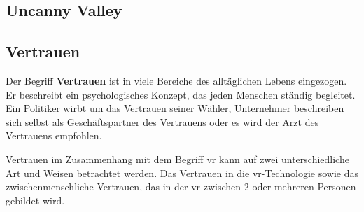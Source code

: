 \documentclass[a4paper,11pt]{article}%
\renewcommand{\\}{\vspace*{0.5\baselineskip} \newline}
\begin{document}
\subsection{Uncanny Valley}

%




	





\newpage

	\subsection{Vertrauen}
	\label{Vertrauen}
Der Begriff \textbf{Vertrauen} ist in viele Bereiche des alltäglichen Lebens eingezogen. Er beschreibt ein psychologisches Konzept, das jeden Menschen ständig begleitet.
Ein Politiker wirbt um das Vertrauen seiner Wähler, Unternehmer beschreiben sich selbst als Geschäftspartner des Vertrauens oder es wird der \dq{}Arzt des Vertrauens\dq{} empfohlen.

Vertrauen im Zusammenhang mit dem Begriff \dq{}\ac{vr}\dq{} kann auf zwei unterschiedliche Art und Weisen betrachtet werden. Das Vertrauen in die \ac{vr}-Technologie sowie das zwischenmenschliche Vertrauen, das in der \ac{vr} zwischen 2 oder mehreren Personen gebildet wird.
\end{document}
